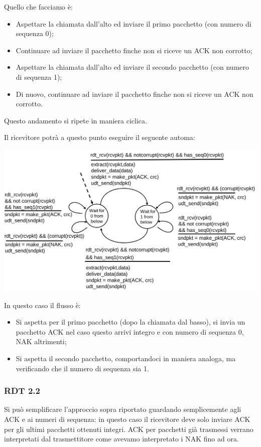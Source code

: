 \documentclass[a4paper,11pt]{article}
\begin{document}
Quello che facciamo è:
\begin{itemize}
	\item Aspettare la chiamata dall'alto ed inviare il primo pacchetto (con numero di sequenza 0);
	\item Continuare ad inviare il pacchetto finche non si riceve un ACK non corrotto;
	\item Aspettare la chiamata dall'alto ed inviare il secondo pacchetto (con numero di sequenza 1);
	\item Di nuovo, continuare ad inviare il pacchetto finche non si riceve un ACK non corrotto.
\end{itemize}

Questo andamento si ripete in maniera ciclica.

\newpage

Il ricevitore potrà a questo punto eseguire il seguente automa:
\begin{center}
	\includegraphics[scale=0.25]{../figures/rdt21fsm2.png}
\end{center}

In questo caso il flusso è:
\begin{itemize}
	\item Si aspetta per il primo pacchetto (dopo la chiamata dal basso), si invia un pacchetto ACK nel caso questo arrivi integro e con numero di sequenza 0, NAK altrimenti;
	\item Si aspetta il secondo pacchetto, comportandoci in maniera analoga, ma verificando che il numero di sequenza sia 1.
\end{itemize}

\subsubsection{RDT 2.2}
Si può semplificare l'approccio sopra riportato guardando semplicemente agli ACK e ai numeri di sequenza: in questo caso il ricevitore deve solo inviare ACK per gli ultimi pacchetti ottenuti integri.
ACK per pacchetti già trasmessi verrano interpretati dal trasmettitore come avevamo interpretato i NAK fino ad ora.
\end{document}
